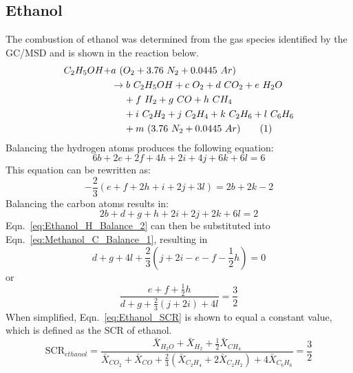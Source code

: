 \documentclass[12pt]{article}
\newcommand\numberthis{\addtocounter{equation}{1}\tag{\theequation}}
\begin{document}
\subsection{Ethanol}
\label{ssec:Ethanol_SCR}
The combustion of ethanol was determined from the gas species identified by the GC/MSD and is shown in the reaction below.
\begin{align*}
C_{2}H_{5}OH+&a~(O_{2}+3.76~N_{2}+0.0445~Ar)\\
&\rightarrow b~C_{2}H_{5}OH+c~O_{2}+ d~CO_{2}+e~H_{2}O\\
&~~~~+f~H_{2}+ g~CO+h~CH_{4}\\
&~~~~ +i~C_{2}H_{2}+j~C_{2}H_{4}+k~C_{2}H_{6}+l~C_{6}H_{6}\\
&~~~~+m~(3.76~N_{2}+0.0445~Ar) \numberthis \label{eq:Ethanol_rxn}
\end{align*}
Balancing the hydrogen atoms produces the following equation:
\begin{equation}
\label{eq:Ethanol_H_Balance_1}
6b+2e+2f+4h+2i+4j+6k+6l=6
\end{equation}
This equation can be rewritten as:
\begin{equation}
\label{eq:Ethanol_H_Balance_2}
-\frac{2}{3}\left(e+f+2h+i+2j+3l\right)=2b+2k-2
\end{equation}
Balancing the carbon atoms results in:
\begin{equation}
\label{eq:Ethanol_C_Balance_1}
2b+d+g+h+2i+2j+2k+6l=2
\end{equation}
Eqn.~\ref{eq:Ethanol_H_Balance_2} can then be substituted into Eqn.~\ref{eq:Methanol_C_Balance_1}, resulting in
\begin{equation}
\label{eq:Ethanol_C_Balance_2}
d+g+4l+\frac{2}{3}\left(j+2i-e-f-\frac{1}{2}h\right)=0
\end{equation}
or
\begin{equation}
\label{eq:Ethanol_SCR}
\frac{e+f+\frac{1}{2}h}{d+g+\frac{2}{3}(j+2i)+4l}=\frac{3}{2}
\end{equation}
When simplified, Eqn.~\ref{eq:Ethanol_SCR} is shown to equal a constant value, which is defined as the $\text{SCR}$ of ethanol.
\begin{equation}\label{eq:prod_ratio_ethanol}
\text{SCR}_{ethanol}=\frac{\bar{X}_{H_2O}+\bar{X}_{H_2}+\frac{1}{2}\bar{X}_{CH_4}}{\bar{X}_{CO_2}+\bar{X}_{CO}+\frac{2}{3}(\bar{X}_{C_2H_4}+2\bar{X}_{C_2H_2})+4\bar{X}_{C_6H_6}}=\frac{3}{2}
\end{equation}

\pagebreak
\end{document}
